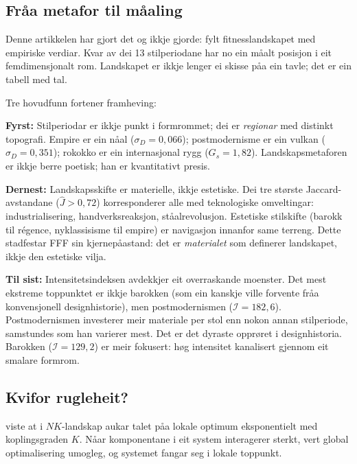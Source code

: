 \documentclass[10pt, a4paper, twocolumn]{article}
\begin{document}
\subsection{Fr\r{a}a metafor til m\r{a}aling}

Denne artikkelen har gjort det \citet{wright1932} og \citet{kauffman1993} ikkje gjorde: fylt fitnesslandskapet med empiriske verdiar. Kvar av dei 13 stilperiodane har no ein m\r{a}alt posisjon i eit femdimensjonalt rom. Landskapet er ikkje lenger ei skisse p\r{a}a ein tavle; det er ein tabell med tal.

Tre hovudfunn fortener framheving:

\textbf{Fyrst:} Stilperiodar er ikkje punkt i formrommet; dei er \emph{regionar} med distinkt topografi. Empire er ein n\r{a}al ($\sigma_D = 0{,}066$); postmodernisme er ein vulkan ($\sigma_D = 0{,}351$); rokokko er ein internasjonal rygg ($G_s = 1{,}82$). Landskapsmetaforen er ikkje berre poetisk; han er kvantitativt presis.

\textbf{Dernest:} Landskapsskifte er materielle, ikkje estetiske. Dei tre st\o rste Jaccard-avstandane ($\hat{J} > 0{,}72$) korresponderer alle med teknologiske omveltingar: industrialisering, handverksreaksjon, st\r{a}alrevolusjon. Estetiske stilskifte (barokk til r\'{e}gence, nyklassisisme til empire) er navigasjon innanfor same terreng. Dette stadfestar FFF sin kjernep\r{a}astand: det er \emph{materialet} som definerer landskapet, ikkje den estetiske vilja.

\textbf{Til sist:} Intensitetsindeksen avdekkjer eit overraskande moenster. Det mest ekstreme toppunktet er ikkje barokken (som ein kanskje ville forvente fr\r{a}a konvensjonell designhistorie), men postmodernismen ($\mathcal{I} = 182{,}6$). Postmodernismen investerer meir materiale per stol enn nokon annan stilperiode, samstundes som han varierer mest. Det er det dyraste oppr\o ret i designhistoria. Barokken ($\mathcal{I} = 129{,}2$) er meir fokusert: h\o g intensitet kanalisert gjennom eit smalare formrom.


\subsection{Kvifor rugleheit?}

\citet{kauffman1993} viste at i $NK$-landskap aukar talet p\r{a}a lokale optimum eksponentielt med koplingsgraden $K$. N\r{a}ar komponentane i eit system interagerer sterkt, vert global optimalisering umogleg, og systemet fangar seg i lokale toppunkt.
\end{document}
